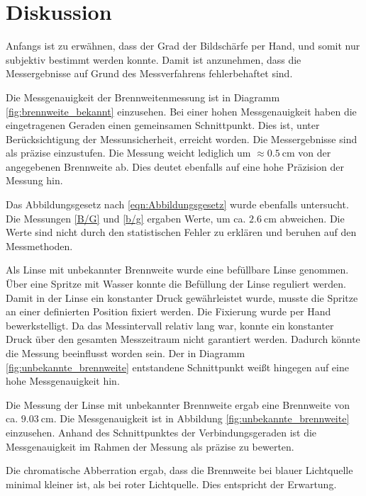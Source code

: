 \section{Diskussion}

Anfangs ist zu erwähnen, dass der Grad der Bildschärfe per Hand, und somit
nur subjektiv bestimmt werden konnte. Damit ist anzunehmen, dass die Messergebnisse
auf Grund des Messverfahrens fehlerbehaftet sind.

Die Messgenauigkeit der Brennweitenmessung ist in Diagramm
\ref{fig:brennweite_bekannt} einzusehen. Bei einer hohen Messgenauigkeit haben
die eingetragenen Geraden einen gemeinsamen Schnittpunkt. Dies ist, unter
Berücksichtigung der Messunsicherheit, erreicht worden. Die Messergebnisse
sind als präzise einzustufen. Die Messung weicht lediglich um
$\approx\SI{0,5}{\centi\meter}$ von der angegebenen Brennweite ab. Dies deutet
ebenfalls auf eine hohe Präzision der Messung hin.

Das Abbildungsgesetz nach \eqref{eqn:Abbildungsgesetz} wurde ebenfalls
untersucht. Die Messungen \eqref{B/G} und \eqref{b/g} ergaben Werte,
um ca. $\SI{2,6}{\centi\meter}$ abweichen. Die Werte sind nicht durch
den statistischen Fehler zu erklären und beruhen auf den Messmethoden.

Als Linse mit unbekannter Brennweite wurde eine befüllbare Linse genommen. Über eine
Spritze mit Wasser konnte die Befüllung der Linse reguliert werden.
Damit in der Linse ein konstanter Druck gewährleistet wurde, musste die Spritze an
einer definierten Position fixiert werden.
Die Fixierung wurde per Hand bewerkstelligt. Da das Messintervall relativ lang
war, konnte ein konstanter Druck über den gesamten Messzeitraum nicht
garantiert werden. Dadurch könnte
die Messung beeinflusst worden sein. Der in Diagramm
\ref{fig:unbekannte_brennweite} entstandene Schnittpunkt weißt hingegen auf eine
hohe Messgenauigkeit hin.

Die Messung der Linse mit unbekannter Brennweite ergab eine Brennweite von ca. $\SI{9,03}{\centi\meter}$.
Die Messgenauigkeit ist in Abbildung \ref{fig:unbekannte_brennweite} einzusehen.
Anhand des Schnittpunktes der Verbindungsgeraden ist die Messgenauigkeit im Rahmen
der Messung als präzise zu bewerten.

Die chromatische Abberration ergab, dass die Brennweite bei blauer Lichtquelle
minimal kleiner ist, als bei roter Lichtquelle. Dies entspricht der Erwartung.
